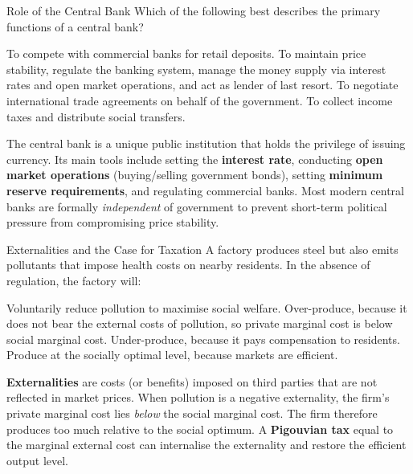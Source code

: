 \documentclass[paper=a5]{scrartcl}
\begin{document}
\begin{question}[type=mc]{Role of the Central Bank}
Which of the following best describes the primary functions of a central bank?
\begin{choices}
  \choice        To compete with commercial banks for retail deposits.
  \correctchoice To maintain price stability, regulate the banking system,
                 manage the money supply via interest rates and open market
                 operations, and act as lender of last resort.
  \choice        To negotiate international trade agreements on behalf of the
                 government.
  \choice        To collect income taxes and distribute social transfers.
\end{choices}
\begin{solution}
  The central bank is a unique public institution that holds the privilege of
  issuing currency. Its main tools include setting the \textbf{interest rate},
  conducting \textbf{open market operations} (buying/selling government bonds),
  setting \textbf{minimum reserve requirements}, and regulating commercial
  banks. Most modern central banks are formally \emph{independent} of
  government to prevent short-term political pressure from compromising
  price stability.
\end{solution}
\end{question}

\begin{question}[type=mc]{Externalities and the Case for Taxation}
A factory produces steel but also emits pollutants that impose health costs
on nearby residents. In the absence of regulation, the factory will:
\begin{choices}
  \choice        Voluntarily reduce pollution to maximise social welfare.
  \correctchoice Over-produce, because it does not bear the external costs
                 of pollution, so private marginal cost is below social
                 marginal cost.
  \choice        Under-produce, because it pays compensation to residents.
  \choice        Produce at the socially optimal level, because markets are
                 efficient.
\end{choices}
\begin{solution}
  \textbf{Externalities} are costs (or benefits) imposed on third parties
  that are not reflected in market prices. When pollution is a negative
  externality, the firm's private marginal cost lies \emph{below} the social
  marginal cost. The firm therefore produces too much relative to the social
  optimum. A \textbf{Pigouvian tax} equal to the marginal external cost can
  internalise the externality and restore the efficient output level.
\end{solution}
\end{question}
\end{document}
